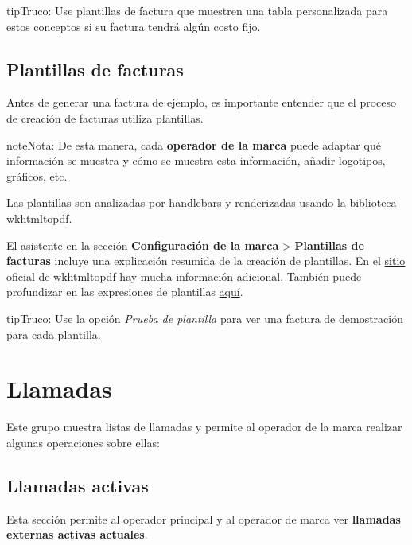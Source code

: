 \documentclass[letterpaper,10pt,spanish]{sphinxmanual}
\begin{document}
\begin{notice}{tip}{Truco:}
Use plantillas de factura que muestren una tabla personalizada para estos conceptos si su factura tendrá algún costo fijo.
\end{notice}


\subsection{Plantillas de facturas}
\label{administration_portal/brand/invoicing/invoice_templates::doc}\label{administration_portal/brand/invoicing/invoice_templates:invoice-templates}
Antes de generar una factura de ejemplo, es importante entender que el proceso de creación de facturas utiliza plantillas.

\begin{notice}{note}{Nota:}
De esta manera, cada \textbf{operador de la marca} puede adaptar qué información se muestra y cómo se muestra esta información, añadir logotipos, gráficos, etc.
\end{notice}

Las plantillas son analizadas por \href{https://github.com/XaminProject/handlebars.php}{handlebars} y renderizadas usando la biblioteca \href{https://wkhtmltopdf.org/}{wkhtmltopdf}.

El asistente en la sección \textbf{Configuración de la marca} \textgreater{} \textbf{Plantillas de facturas} incluye una explicación resumida de la creación de plantillas. En el \href{https://wkhtmltopdf.org/usage/wkhtmltopdf.txt}{sitio oficial de wkhtmltopdf} hay mucha información adicional. También puede profundizar en las expresiones de plantillas \href{http://handlebarsjs.com/expressions.html}{aquí}.

\begin{notice}{tip}{Truco:}
Use la opción \emph{Prueba de plantilla} para ver una factura de demostración para cada plantilla.
\end{notice}


\section{Llamadas}
\label{administration_portal/brand/calls/index::doc}\label{administration_portal/brand/calls/index:calls}
Este grupo muestra listas de llamadas y permite al operador de la marca realizar algunas operaciones sobre ellas:


\subsection{Llamadas activas}
\label{administration_portal/brand/calls/active_calls::doc}\label{administration_portal/brand/calls/active_calls:active-calls}
Esta sección permite al operador principal y al operador de marca ver \textbf{llamadas externas activas actuales}.
\end{document}
